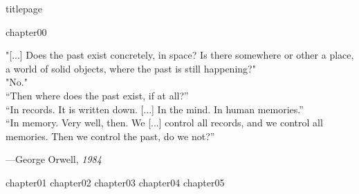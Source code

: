 \documentclass[a4paper,12pt,twoside]{book}
\begin{document}
    \frontmatter
    {titlepage}

    \cleardoublepage
    
    \setcounter{tocdepth}{1}
    \tableofcontents
    \restoregeometry
    \cleardoublepage
    
    
    \begingroup
    \let\clearpage\relax
    \let\cleardoublepage\relax
    \listoffigures    
    \listoftables
    \endgroup
    
    {chapter00}
    \cleardoublepage

    \thispagestyle{empty}
    \vspace*{\fill}
    \setlength{}
    \epigraph{
            "[...] Does the past exist concretely, in space? Is there somewhere or other a place, a world of solid objects, where the past is still happening?"\\
            "No."\\
            “Then where does the past exist, if at all?”\\
            “In records. It is written down. [...] In the mind. In human memories.”\\
            “In memory. Very well, then. We [...] control all records, and we control all memories. Then we control the past, do we not?”
    }{---George Orwell, \textit{1984}}
    \vspace*{\fill}
    \clearpage
    \thispagestyle{empty}
    \clearpage
    
    \mainmatter
    {chapter01}
    \cleardoublepage
    {chapter02}
    \cleardoublepage
    {chapter03}
    \cleardoublepage
    {chapter04}
    \cleardoublepage
    {chapter05}
    \cleardoublepage
    
    
    \backmatter
    \printglossary[type=\acronymtype, title=Acronimi e nomenclature, toctitle=Acronimi]
    \cleardoublepage
	\printbibliography[heading=bibintoc, title={Bibliografia}]
    \restoregeometry
\end{document}
